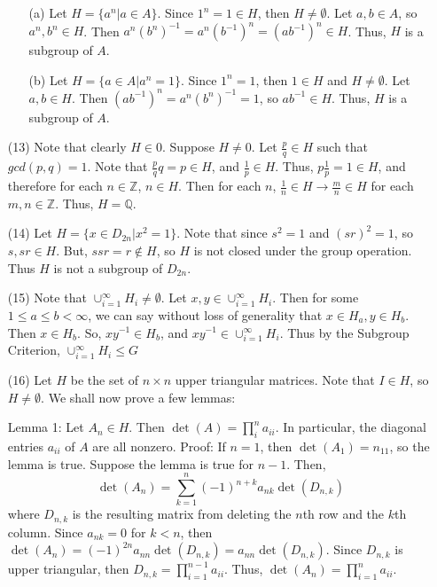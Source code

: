 \documentclass[12pt]{article}
\begin{document}
\begin{itemize}
\begin{itemize}
\item[(a)]
Let $H = \{ a^n | a \in A \}$. Since $1^n = 1 \in H$, then $H \neq \emptyset$. Let $a, b \in A$, so $a^n, b^n \in H$. Then $a^n(b^n)^{-1} = a^n(b^{-1})^n = (ab^{-1})^n \in H$. Thus, $H$ is a subgroup of $A$.
\item[(b)]
Let $H = \{ a \in A | a^n = 1 \}$. Since $1^n = 1$, then $1 \in H$ and $H \neq \emptyset$. Let $a, b \in H$. Then $(ab^{-1})^n = a^n(b^{n})^{-1} = 1$, so $ab^{-1} \in H$.  Thus, $H$ is a subgroup of $A$.
\end{itemize}
\item[(13)] 
Note that clearly $H \in 0$. Suppose $H \neq 0$. Let $\frac{p}{q} \in H$ such that $gcd(p, q) = 1$. Note that $\frac{p}{q}q = p \in H$, and $\frac{1}{p} \in H$. Thus, $p\frac{1}{p} = 1 \in H$, and therefore for each $n \in \mathbb{Z}$, $n \in H$. Then for each $n$, $\frac{1}{n} \in H \rightarrow \frac{m}{n} \in H$ for each $m, n \in \mathbb{Z}$. Thus, $H = \mathbb{Q}$.
\item[(14)]
Let $H = \{ x \in D_{2n} | x^2 = 1 \}$. Note that since $s^2 = 1$ and $(sr)^2 = 1$, so $s, sr \in H$. But, $ssr = r \not \in H$, so $H$ is not closed under the group operation. Thus $H$ is not a subgroup of $D_{2n}$.
\item[(15)]
Note that $\cup_{i=1}^\infty H_i \neq \emptyset$. Let $x, y \in \cup_{i=1}^\infty H_i$. Then for some $1 \leq a \leq b < \infty$, we can say without loss of generality that $x \in H_a, y \in H_b$. Then $x \in H_b$. So, $xy^{-1} \in H_b$, and $xy^{-1} \in \cup_{i=1}^\infty H_i$. Thus by the Subgroup Criterion, $\cup_{i=1}^\infty H_i \leq G$
\item[(16)]
Let $H$ be the set of $n \times n$ upper triangular matrices. Note that $I \in H$, so $H \neq \emptyset$. We shall now prove a few lemmas:

Lemma 1: Let $A_n \in H$. Then $\det(A) = \prod_{i}^n a_{ii}$. In particular, the diagonal entries $a_{ii}$ of $A$ are all nonzero. Proof: If $n = 1$, then $\det(A_1) = n_{11}$, so the lemma is true. Suppose the lemma is true for $n - 1$. Then, 
$$\det(A_n) = \sum_{k=1}^{n}(-1)^{n + k}a_{n k}\det(D_{n, k})$$
where $D_{n, k}$ is the resulting matrix from deleting the $n$th row and the $k$th column. Since $a_{n k} = 0$ for $k < n$, then $\det(A_n) = (-1)^{2n}a_{nn}\det(D_{n, k}) = a_{nn}\det(D_{n, k})$. Since $D_{n, k}$ is upper triangular, then $D_{n, k} = \prod_{i=1}^{n-1}a_{ii}$. Thus, $\det(A_n) = \prod_{i=1}^n a_{ii}$.


\end{itemize}
\end{document}
